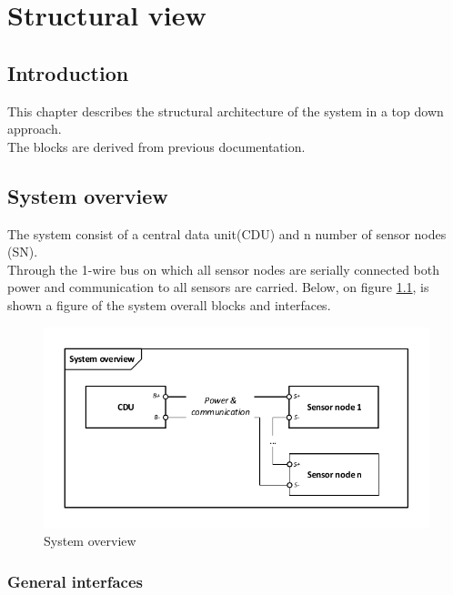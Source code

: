 \chapter{Structural view}

\section{Introduction}
This chapter describes the structural architecture of the system in a top down approach.\\
The blocks are derived from previous documentation.


\section{System overview}
The system consist of a central data unit(CDU) and n number of sensor nodes (SN).\\
Through the 1-wire bus on which all sensor nodes are serially connected both power and communication to all sensors are carried. Below, on figure \ref{fig:systembdd}, is shown a figure of the system overall blocks and interfaces.
\begin{figure}[hbpt]
	\centering
	\includegraphics[width=.9\textwidth]{billeder/systembdd}
	\caption{System overview}
	\label{fig:systembdd}
\end{figure}

\subsection{General interfaces}

